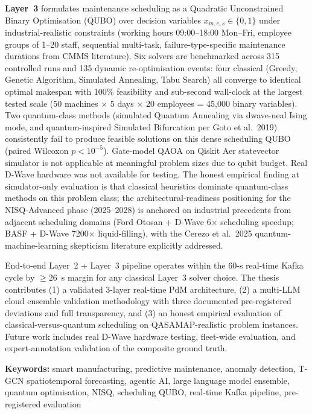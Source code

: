 \textbf{Layer~3} formulates maintenance scheduling as a Quadratic Unconstrained Binary Optimisation (QUBO) over decision variables $x_{m,e,s} \in \{0,1\}$ under industrial-realistic constraints (working hours 09:00--18:00 Mon--Fri, employee groups of 1--20 staff, sequential multi-task, failure-type-specific maintenance durations from CMMS literature). Six solvers are benchmarked across 315 controlled runs and 135 dynamic re-optimisation events: four classical (Greedy, Genetic Algorithm, Simulated Annealing, Tabu Search) all converge to identical optimal makespan with 100\% feasibility and sub-second wall-clock at the largest tested scale (50 machines $\times$ 5 days $\times$ 20 employees = 45{,}000 binary variables). Two quantum-class methods (simulated Quantum Annealing via dwave-neal Ising mode, and quantum-inspired Simulated Bifurcation per Goto et al.\ 2019) consistently fail to produce feasible solutions on this dense scheduling QUBO (paired Wilcoxon $p < 10^{-5}$). Gate-model QAOA on Qiskit Aer statevector simulator is not applicable at meaningful problem sizes due to qubit budget. Real D-Wave hardware was not available for testing. The honest empirical finding at simulator-only evaluation is that classical heuristics dominate quantum-class methods on this problem class; the architectural-readiness positioning for the NISQ-Advanced phase (2025--2028) is anchored on industrial precedents from adjacent scheduling domains (Ford Otosan + D-Wave 6$\times$ scheduling speedup; BASF + D-Wave 7200$\times$ liquid-filling), with the Cerezo et al.\ 2025 quantum-machine-learning skepticism literature explicitly addressed.

End-to-end Layer~2 + Layer~3 pipeline operates within the 60-s real-time Kafka cycle by $\geq 26$~s margin for any classical Layer~3 solver choice. The thesis contributes (1) a validated 3-layer real-time PdM architecture, (2) a multi-LLM cloud ensemble validation methodology with three documented pre-registered deviations and full transparency, and (3) an honest empirical evaluation of classical-versus-quantum scheduling on QASAMAP-realistic problem instances. Future work includes real D-Wave hardware testing, fleet-wide evaluation, and expert-annotation validation of the composite ground truth.

\noindent
\textbf{Keywords:} smart manufacturing, predictive maintenance, anomaly detection, T-GCN spatiotemporal forecasting, agentic AI, large language model ensemble, quantum optimisation, NISQ, scheduling QUBO, real-time Kafka pipeline, pre-registered evaluation
